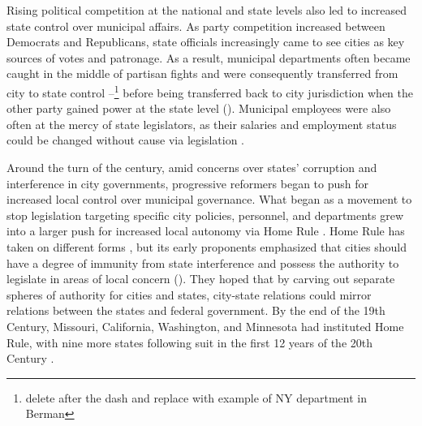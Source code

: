 \documentclass[12pt]{article}
\begin{document}
Rising political competition at the national and state levels also led to increased state control over municipal affairs. As party competition increased between Democrats and Republicans, state officials increasingly came to see cities as key sources of votes and patronage. As a result, municipal departments often became caught in the middle of partisan fights and were consequently transferred from city to state control --\footnote{delete after the dash and replace with example of NY department in Berman} before being transferred back to city jurisdiction when the other party gained power at the state level (\cites[p. 57-60]{bermanLocalGovernmentStates2003}[p. 11]{kraneHomeRuleAmerica2000}). Municipal employees were also often at the mercy of state legislators, as their salaries and employment status could be changed without cause via legislation \parencite[p. 59]{bermanLocalGovernmentStates2003}.

Around the turn of the century, amid concerns over states' corruption and interference in city governments, progressive reformers began to push for increased local control over municipal governance. What began as a movement to stop legislation targeting specific city policies, personnel, and departments grew into a larger push for increased local autonomy via Home Rule \parencite[p. 11]{kraneHomeRuleAmerica2000}. Home Rule has taken on different forms \parencite{richardsonDillonRuleMars2011}, but its early proponents emphasized that cities should have a degree of immunity from state interference and possess the authority to legislate in areas of local concern (\cites[p. 11-12]{kraneHomeRuleAmerica2000}[p. 1124-1125]{dillerIntrastatePreemption2007}). They hoped that by carving out separate spheres of authority for cities and states, city-state relations could mirror relations between the states and federal government. By the end of the 19th Century, Missouri, California, Washington, and Minnesota had instituted Home Rule, with nine more states following suit in the first 12 years of the 20th Century \parencite[p. 11]{kraneHomeRuleAmerica2000}.
\end{document}
